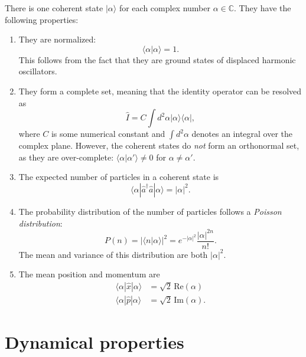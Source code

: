 \documentclass[prx,12pt]{revtex4-2}
\begin{document}
There is one coherent state $|\alpha\rangle$ for each complex number
$\alpha \in \mathbb{C}$.  They have the following properties:
\begin{enumerate}
\item They are normalized:
  \begin{equation}
    \langle\alpha|\alpha\rangle = 1.
    \label{normalization}
  \end{equation}
  This follows from the fact that they are ground states of displaced
  harmonic oscillators.

\item They form a complete set, meaning that the identity operator can
  be resolved as
  \begin{equation}
    \hat{I} = C \int d^2\alpha |\alpha\rangle\langle\alpha|,
  \end{equation}
  where $C$ is some numerical constant and $\int d^2\alpha$ denotes an
  integral over the complex plane.  However, the coherent states do
  \textit{not} form an orthonormal set, as they are over-complete:
  $\langle\alpha|\alpha'\rangle \ne 0$ for $\alpha \ne \alpha'$.

\item The expected number of particles in a coherent state is
  \begin{equation}
    \langle\alpha| \hat{a}^\dagger\hat{a} | \alpha\rangle
    = |\alpha|^2.
  \end{equation}

\item The probability distribution of the number of particles follows
  a \textit{Poisson distribution}:
  \begin{equation}
    P(n) = |\langle n | \alpha\rangle|^2 = e^{-|\alpha|^2} \frac{|\alpha|^{2n}}{n!}.
  \end{equation}
  The mean and variance of this distribution are both $|\alpha|^2$.

\item The mean position and momentum are
  \begin{align}
    \langle \alpha | \hat{x}|\alpha\rangle &= \sqrt{2} \, \mathrm{Re}(\alpha) 
    \label{x} \\
    \langle \alpha | \hat{p}|\alpha\rangle &= \sqrt{2} \, \mathrm{Im}(\alpha).
    \label{p}
  \end{align}
\end{enumerate}

\section{Dynamical properties}
\end{document}

